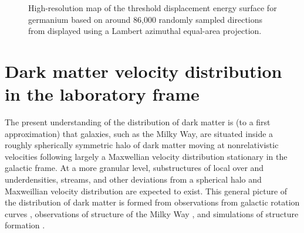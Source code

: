 \begin{figure}
    \caption{High-resolution map of the threshold displacement energy surface for germanium based on around 86,000 randomly sampled directions from \textcite{KadribasicEtAl2018} displayed using a Lambert azimuthal equal-area projection.}
    \label{fig:ge-threshold-energy}
\end{figure}

\chapter{Dark matter velocity distribution in the laboratory frame}
\label{chap:dist}

The present understanding of the distribution of dark matter is (to a first approximation) that galaxies, such as the Milky Way, are situated inside a roughly spherically symmetric halo of dark matter moving at nonrelativistic velocities following largely a Maxwellian velocity distribution stationary in the galactic frame. At a more granular level, substructures of local over and underdensities, streams, and other deviations from a spherical halo and Maxweillian velocity distribution are expected to exist. This general picture of the distribution of dark matter is formed from observations from galactic rotation curves \parencites{SofueEtAl1999, LelliMcGaughSchombert2016}, observations of structure of the Milky Way \parencites{PortailEtAl2016, LabiniEtAl2023, BelokurovEtAl2018, KruijssenEtAl2018, HelmiEtAl2018}, and simulations of structure formation \parencites{VogelsbergerEtAl2014, WangEtAl2015, KlypinEtAl2016, SpringelEtAl2017, SpringelEtAl2008, DiemandEtAl2008, StadelEtAl2009, vandenBoschOgiya2018}.

